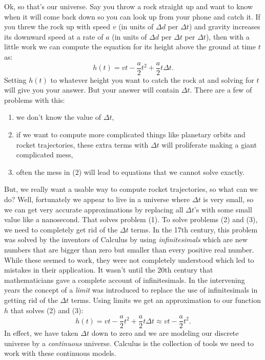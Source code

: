 \documentclass[12pt]{article}
\begin{document}
Ok, so that's our universe.  Say you throw a rock straight up and want to know when it will come back down so you can look up from your phone and catch it.  If you threw the rock up with speed $v$ (in units of $\Delta d$ per $\Delta t$) and gravity increases its downward speed at a rate of $a$ (in units of $\Delta d$ per $\Delta t$ per $\Delta t$), then with a little work we can compute the equation for its height above the ground at time $t$ as:
\[h(t) = vt - \frac{a}{2}t^2 + \frac{a}{2}t\Delta t.\]
Setting $h(t)$ to whatever height you want to catch the rock at and solving for $t$ will give you your answer.  But your answer will contain $\Delta t$.  There are a few of problems with this:
\begin{enumerate}
	\itemsep 0em 
	\item we don't know the value of $\Delta t$,
	\item if we want to compute more complicated things like planetary orbits and rocket trajectories, these extra terms with $\Delta t$ will proliferate making a giant complicated mess,
	\item often the mess in (2) will lead to equations that we cannot solve exactly.
\end{enumerate}
But, we really want a usable way to compute rocket trajectories, so what can we do?  Well, fortunately we appear to live in a universe where $\Delta t$ is very small, so we can get very accurate approximations by replacing all $\Delta t$'s with some small value like a nanosecond.  That solves problem (1). To solve problems (2) and (3), we need to completely get rid of the $\Delta t$ terms.  In the 17th century, this problem was solved by the inventors of Calculus by using \emph{infinitesimals} which are new numbers that are bigger than zero but smaller than every positive real number.  While these seemed to work, they were not completely understood which led to mistakes in their application.  It wasn't until the 20th century that mathematicians gave a complete account of infinitesimals.  In the intervening years the concept of a \emph{limit} was introduced to replace the use of infinitesimals in getting rid of the $\Delta t$ terms.  Using limits we get an approximation to our function $h$ that solves (2) and (3):
\[h(t) = vt - \frac{a}{2}t^2 + \frac{a}{2}t\Delta t \approx vt - \frac{a}{2}t^2.\]
In effect, we have taken $\Delta t$ down to zero and we are modeling our discrete universe by a \emph{continuous} universe.  Calculus is the collection of tools we need to work with these continuous models.
\end{document}
